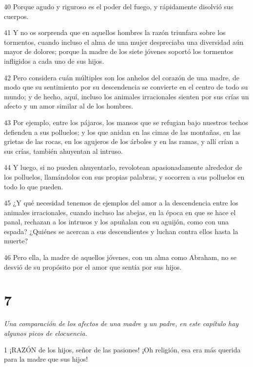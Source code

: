 \par 40 Porque agudo y riguroso es el poder del fuego, y rápidamente disolvió sus cuerpos.

\par 41 Y no os sorprenda que en aquellos hombres la razón triunfara sobre los tormentos, cuando incluso el alma de una mujer despreciaba una diversidad aún mayor de dolores; porque la madre de los siete jóvenes soportó los tormentos infligidos a cada uno de sus hijos.

\par 42 Pero considera cuán múltiples son los anhelos del corazón de una madre, de modo que su sentimiento por su descendencia se convierte en el centro de todo su mundo; y de hecho, aquí, incluso los animales irracionales sienten por sus crías un afecto y un amor similar al de los hombres.

\par 43 Por ejemplo, entre los pájaros, los mansos que se refugian bajo nuestros techos defienden a sus polluelos; y los que anidan en las cimas de las montañas, en las grietas de las rocas, en los agujeros de los árboles y en las ramas, y allí crían a sus crías, también ahuyentan al intruso.

\par 44 Y luego, si no pueden ahuyentarlo, revolotean apasionadamente alrededor de los polluelos, llamándolos con sus propias palabras, y socorren a sus polluelos en todo lo que pueden.

\par 45 ¿Y qué necesidad tenemos de ejemplos del amor a la descendencia entre los animales irracionales, cuando incluso las abejas, en la época en que se hace el panal, rechazan a los intrusos y los apuñalan con su aguijón, como con una espada? ¿Quiénes se acercan a sus descendientes y luchan contra ellos hasta la muerte?

\par 46 Pero ella, la madre de aquellos jóvenes, con un alma como Abraham, no se desvió de su propósito por el amor que sentía por sus hijos.

\chapter{7}

\par \textit{Una comparación de los afectos de una madre y un padre, en este capítulo hay algunos picos de elocuencia.}

\par 1 ¡RAZÓN de los hijos, señor de las pasiones! ¡Oh religión, esa era más querida para la madre que sus hijos!

